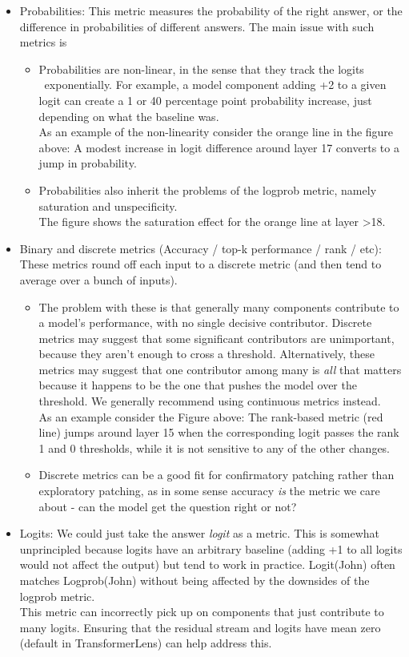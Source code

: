\documentclass[nonatbib]{article}
\begin{document}
\begin{itemize}
\begin{itemize}
    \end{itemize}
    \item Probabilities: This metric measures the probability of the right answer, or the difference in probabilities of different answers. The main issue with such metrics is
    \begin{itemize}
        \item Probabilities are non-linear, in the sense that they track the logits ~exponentially. For example, a model component adding +2 to a given logit can create a 1 or 40 percentage point probability increase, just depending on what the baseline was.
        \\
        As an example of the non-linearity consider the orange line in the figure above: A modest increase in logit difference around layer 17 converts to a jump in probability.
        \item Probabilities also inherit the problems of the logprob metric, namely saturation and unspecificity.
        \\
        The figure shows the saturation effect for the orange line at layer >18.
    \end{itemize}
    \item Binary and discrete metrics (Accuracy / top-k performance / rank / etc): These metrics round off each input to a discrete metric (and then tend to average over a bunch of inputs).
    \begin{itemize}
        \item The problem with these is that generally many components contribute to a model’s performance, with no single decisive contributor. Discrete metrics may suggest that some significant contributors are unimportant, because they aren’t enough to cross a threshold. Alternatively, these metrics may suggest that one contributor among many is \textit{all} that matters because it happens to be the one that  pushes the model over the threshold. We generally recommend using continuous metrics instead.
        \\
        As an example consider the Figure above: The rank-based metric (red line) jumps around layer 15 when the corresponding logit passes the rank 1 and 0 thresholds, while it is not sensitive to any of the other changes.
        \item Discrete metrics can be a good fit for confirmatory patching rather than exploratory patching, as in some sense accuracy \textit{is} the metric we care about - can the model get the question right or not?
    \end{itemize}
    \item Logits: We could just take the answer \textit{logit} as a metric. This is somewhat unprincipled because logits have an arbitrary baseline (adding +1 to all logits would not affect the output) but tend to work in practice. Logit(John) often matches Logprob(John) without being affected by the downsides of the logprob metric.
    \\
    This metric can incorrectly pick up on components that just contribute to many logits. Ensuring that the residual stream and logits have mean zero (default in TransformerLens) can help address this.
\end{itemize}
\end{document}
